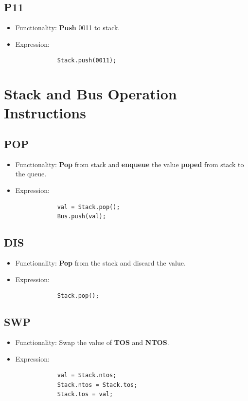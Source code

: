\documentclass[11pt]{report}
\begin{document}
    \subsection{P11}
    \begin{itemize}
        \item Functionality: \textbf{Push} 0011 to stack.
        \item Expression:
        \begin{verbatim}
            Stack.push(0011);
        \end{verbatim}
    \end{itemize}

    \section{Stack and Bus Operation Instructions}
    \subsection{POP}
    \begin{itemize}
        \item Functionality: \textbf{Pop} from stack and
                \textbf{enqueue} the value \textbf{poped} from stack to the queue.
        \item Expression:
        \begin{verbatim}
            val = Stack.pop();
            Bus.push(val);
        \end{verbatim}
    \end{itemize}

    \subsection{DIS}
    \begin{itemize}
        \item Functionality: \textbf{Pop} from the stack and discard the value.
        \item Expression:
        \begin{verbatim}
            Stack.pop();
        \end{verbatim}
    \end{itemize}

    \subsection{SWP}
    \begin{itemize}
        \item Functionality: Swap the value of \textbf{TOS} and \textbf{NTOS}.
        \item Expression:
        \begin{verbatim}
            val = Stack.ntos;
            Stack.ntos = Stack.tos;
            Stack.tos = val;
        \end{verbatim}
    \end{itemize}
\end{document}

